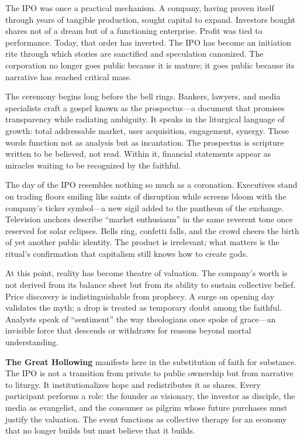 \documentclass[11pt,twoside]{book}
\begin{document}
The IPO was once a practical mechanism.  A company, having proven itself through years of tangible production, sought capital to expand.  Investors bought shares not of a dream but of a functioning enterprise.  Profit was tied to performance.  Today, that order has inverted.  The IPO has become an initiation rite through which stories are sanctified and speculation canonized.  The corporation no longer goes public because it is mature; it goes public because its narrative has reached critical mass.

The ceremony begins long before the bell rings.  Bankers, lawyers, and media specialists craft a gospel known as the prospectus—a document that promises transparency while radiating ambiguity.  It speaks in the liturgical language of growth: total addressable market, user acquisition, engagement, synergy.  These words function not as analysis but as incantation.  The prospectus is scripture written to be believed, not read.  Within it, financial statements appear as miracles waiting to be recognized by the faithful.

The day of the IPO resembles nothing so much as a coronation.  Executives stand on trading floors smiling like saints of disruption while screens bloom with the company’s ticker symbol—a new sigil added to the pantheon of the exchange.  Television anchors describe “market enthusiasm” in the same reverent tone once reserved for solar eclipses.  Bells ring, confetti falls, and the crowd cheers the birth of yet another public identity.  The product is irrelevant; what matters is the ritual’s confirmation that capitalism still knows how to create gods.

At this point, reality has become theatre of valuation.  The company’s worth is not derived from its balance sheet but from its ability to sustain collective belief.  Price discovery is indistinguishable from prophecy.  A surge on opening day validates the myth; a drop is treated as temporary doubt among the faithful.  Analysts speak of “sentiment” the way theologians once spoke of grace—an invisible force that descends or withdraws for reasons beyond mortal understanding.

\textbf{The Great Hollowing} manifests here in the substitution of faith for substance.  The IPO is not a transition from private to public ownership but from narrative to liturgy.  It institutionalizes hope and redistributes it as shares.  Every participant performs a role: the founder as visionary, the investor as disciple, the media as evangelist, and the consumer as pilgrim whose future purchases must justify the valuation.  The event functions as collective therapy for an economy that no longer builds but must believe that it builds.
\end{document}
